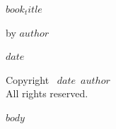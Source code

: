 \documentclass[12pt]{scrbook}
\def\booktitle{$book_title$}
\def\bookauthor{$author$}
\def\bookdate{$date$}
\begin{document}
\thispagestyle{empty}
\begin{center}
\vspace*{2in}
{\Huge\bfseries\booktitle\par}
\vspace{1in}
{\large by \bookauthor\par}
\vfill
{\large\bookdate}
\end{center}

\clearpage
\thispagestyle{empty}
\vspace*{\fill}
\begin{center}
\textcolor{ctColorLight}{Copyright \textcopyright\ \bookdate\ \bookauthor}\\
\textcolor{ctColorLight}{All rights reserved.}
\end{center}
\vspace*{\fill}

\clearpage
\tableofcontents

\mainmatter

$body$
\end{document}
